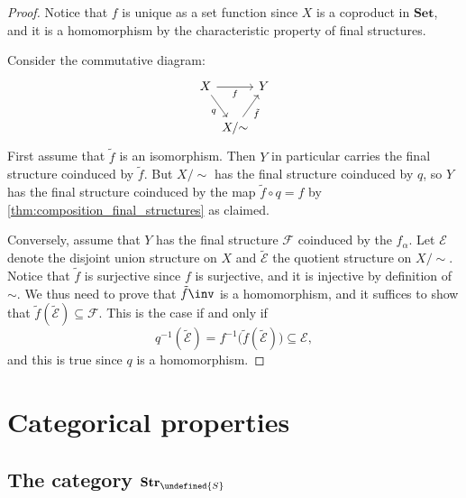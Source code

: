 \documentclass[article, a4paper, 11pt, oneside]{memoir}
\let\mathfrak\undefined
\numberwithin{equation}{chapter}
\newcommand{\calE}{\mathcal{E}}
\newcommand{\calF}{\mathcal{F}}
\newcommand{\strucS}{\mathfrak{S}}
\newcommand{\ncat}[1]{\mathbf{#1}} %
\newcommand{\catSet}{\ncat{Set}} %
\newcommand{\catStruc}[1]{\ncat{Str}_{#1}} %
\newcommand{\catStrucS}{\catStruc{\strucS}} %
\newcommand{\preim}{^{-1}}
\begin{document}
\begin{proof}
    Notice that $f$ is unique as a set function since $X$ is a coproduct in $\catSet$, and it is a homomorphism by the characteristic property of final structures.

    Consider the commutative diagram:
    \begin{equation*}
        \begin{tikzcd}[column sep=0em]
            X
                \ar[rr, "f", swap]
                \ar[dr, "q", swap]
            && Y \\
            & X/{\sim}
                \ar[ur, "\tilde{f}", swap]
        \end{tikzcd}
    \end{equation*}
    First assume that $\tilde{f}$ is an isomorphism. Then $Y$ in particular carries the final structure coinduced by $\tilde{f}$. But $X/{\sim}$ has the final structure coinduced by $q$, so $Y$ has the final structure coinduced by the map $\tilde{f} \circ q = f$ by \cref{thm:composition_final_structures} as claimed.

    Conversely, assume that $Y$ has the final structure $\calF$ coinduced by the $f_\alpha$. Let $\calE$ denote the disjoint union structure on $X$ and $\tilde{\calE}$ the quotient structure on $X/{\sim}$. Notice that $\tilde{f}$ is surjective since $f$ is surjective, and it is injective by definition of $\sim$. We thus need to prove that $\tilde{f}\inv$ is a homomorphism, and it suffices to show that $\tilde{f}(\tilde{\calE}) \subseteq \calF$. This is the case if and only if
    \begin{equation*}
        q\preim(\tilde{\calE})
            = f\preim \bigl( \tilde{f}(\tilde{\calE}) \bigr)
            \subseteq \calE,
    \end{equation*}
    and this is true since $q$ is a homomorphism.
\end{proof}


\section{Categorical properties} \label{sec:structure_categorical}

\subsection{The category $\catStrucS$}
\end{document}
